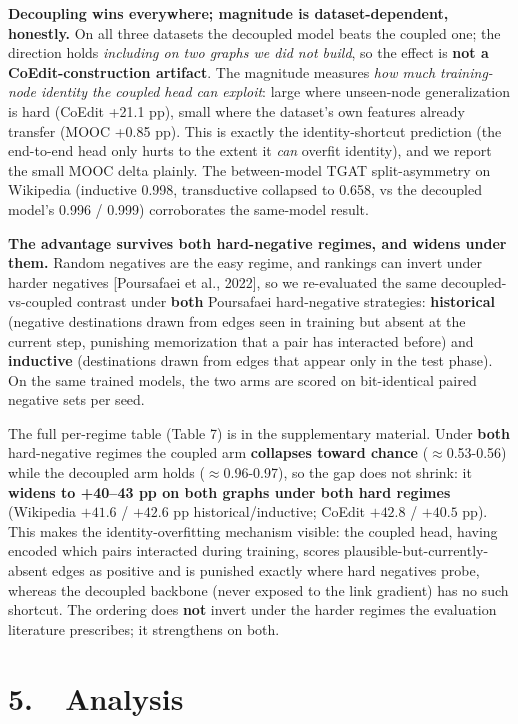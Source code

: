 \documentclass[conference]{IEEEtran}
\begin{document}
\textbf{Decoupling wins everywhere; magnitude is dataset-dependent, honestly.} On all three datasets the decoupled model beats the coupled one; the direction holds \emph{including on two graphs we did not build}, so the effect is \textbf{not a CoEdit-construction artifact}. The magnitude measures \emph{how much training-node identity the coupled head can exploit}: large where unseen-node generalization is hard (CoEdit +21.1 pp), small where the dataset's own features already transfer (MOOC +0.85 pp). This is exactly the identity-shortcut prediction (the end-to-end head only hurts to the extent it \emph{can} overfit identity), and we report the small MOOC delta plainly. The between-model TGAT split-asymmetry on Wikipedia (inductive 0.998, transductive collapsed to 0.658, vs the decoupled model's 0.996 / 0.999) corroborates the same-model result.

\textbf{The advantage survives both hard-negative regimes, and widens under them.} Random negatives are the easy regime, and rankings can invert under harder negatives [Poursafaei et al., 2022], so we re-evaluated the same decoupled-vs-coupled contrast under \textbf{both} Poursafaei hard-negative strategies: \textbf{historical} (negative destinations drawn from edges seen in training but absent at the current step, punishing memorization that a pair has interacted before) and \textbf{inductive} (destinations drawn from edges that appear only in the test phase). On the same trained models, the two arms are scored on bit-identical paired negative sets per seed.

The full per-regime table (Table 7) is in the supplementary material. Under \textbf{both} hard-negative regimes the coupled arm \textbf{collapses toward chance} ($\approx$0.53-0.56) while the decoupled arm holds ($\approx$0.96-0.97), so the gap does not shrink: it \textbf{widens to +40--43 pp on both graphs under both hard regimes} (Wikipedia $+41.6$ / $+42.6$ pp historical/inductive; CoEdit $+42.8$ / $+40.5$ pp). This makes the identity-overfitting mechanism visible: the coupled head, having encoded which pairs interacted during training, scores plausible-but-currently-absent edges as positive and is punished exactly where hard negatives probe, whereas the decoupled backbone (never exposed to the link gradient) has no such shortcut. The ordering does \textbf{not} invert under the harder regimes the evaluation literature prescribes; it strengthens on both.

\section*{5.~~Analysis}
\end{document}
